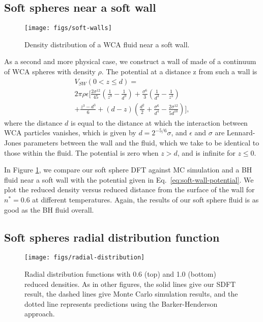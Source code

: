 \documentclass[letterpaper,twocolumn,amsmath,amssymb,prb]{revtex4-1}
\begin{document}
\subsection{Soft spheres near a soft wall}

\begin{figure}
  \centering
  \texttt{[image: figs/soft-walls]}
  \caption{Density distribution of a WCA fluid near a soft wall.}
  \label{fig:soft-walls}
\end{figure}

As a second and more physical case, we construct a wall of made of a
continuum of WCA spheres with density $\rho$.  The potential
at a distance z from such a wall is
\begin{multline}
  V_{SW}(0 < z \leq d) = \\
  2\pi\rho\epsilon\Big[
  \frac{2\sigma^{12}}{45} \left(\frac{1}{z^9}-\frac{1}{d^9}\right)
  +\frac{\sigma^6}{3}\left(\frac{1}{d^3}-\frac{1}{z^3}
  \right) \\
  + \frac{z^3-d^3}{6} + \left( d - z \right)\left(\frac{d^2}{2} +
  \frac{\sigma^6}{d^4} - \frac{2\sigma^{12}}{5d^{10}}\right)
  \Bigg],
\label{eq:soft-wall-potential}
\end{multline}
where the distance $d$ is equal to the distance at which the
interaction between WCA particles vanishes, which is given by $d =
2^{-5/6}\sigma$, and $\epsilon$ and $\sigma$ are Lennard-Jones
parameters between the wall and the fluid, which we take to be
identical to those within the fluid. The potential is zero when $z>d$,
and is infinite for $z\leq 0$.

In Figure \ref{fig:soft-walls}, we compare our soft sphere DFT
against MC simulation and a BH fluid near a soft wall
with the potential given in Eq.~\ref{eq:soft-wall-potential}. We
plot the reduced density versus reduced distance from the surface of
the wall for $n^*=0.6$ at different temperatures. Again, the results
of our soft sphere fluid is as good as the BH fluid
overall.

\subsection{Soft spheres radial distribution function}

\begin{figure}
\begin{center}
  \texttt{[image: figs/radial-distribution]}
\end{center}
\caption{Radial distribution functions with 0.6 (top) and 1.0 (bottom)
  reduced densities. As in other figures, the solid lines give our
  SDFT result, the dashed lines give Monte Carlo simulation results,
  and the dotted line represents predictions using the
  Barker-Henderson approach.}
\label{fig:radial-distribution}
\end{figure}
\end{document}
